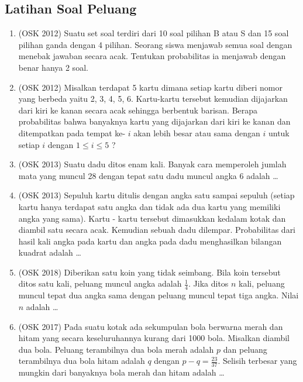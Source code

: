 \subsection{Latihan Soal Peluang}
\begin{enumerate}
            \item (OSK 2012) Suatu set soal terdiri dari 10 soal pilihan B atau S dan 15 soal pilihan ganda dengan 4 pilihan. Seorang siswa menjawab semua soal dengan menebak jawaban secara acak. Tentukan probabilitas ia menjawab dengan benar hanya 2 soal.
        
        \item (OSK 2012) Misalkan terdapat 5 kartu dimana setiap kartu diberi nomor yang berbeda yaitu 2, 3, 4, 5, 6. Kartu-kartu tersebut kemudian dijajarkan dari kiri ke kanan secara acak sehingga berbentuk barisan. Berapa probabilitas bahwa banyaknya kartu yang dijajarkan dari kiri ke kanan dan ditempatkan pada tempat ke- $i$ akan lebih besar atau sama dengan $i$ untuk setiap $i$ dengan $1 \le i \le 5$ ?
        
        \item (OSK 2013) Suatu dadu ditos enam kali. Banyak cara memperoleh jumlah mata yang muncul 28 dengan tepat satu dadu muncul angka 6 adalah \dots
        
        \item (OSK 2013) Sepuluh kartu ditulis dengan angka satu sampai sepuluh (setiap kartu hanya terdapat satu angka dan tidak ada dua kartu yang memiliki angka yang sama). Kartu - kartu tersebut dimasukkan kedalam kotak dan diambil satu secara acak. Kemudian sebuah dadu dilempar. Probabilitas dari hasil kali angka pada kartu dan angka pada dadu menghasilkan bilangan kuadrat adalah \dots
        
        \item (OSK 2018) Diberikan satu koin yang tidak seimbang. Bila koin tersebut ditos satu kali, peluang muncul angka adalah $\frac{1}{4}$. Jika ditos $n$ kali, peluang muncul tepat dua angka sama dengan peluang muncul tepat tiga angka. Nilai $n$ adalah \dots
        
        \item (OSK 2017) Pada suatu kotak ada sekumpulan bola berwarna merah dan hitam yang secara keseluruhannya kurang dari 1000 bola. Misalkan diambil dua bola. Peluang terambilnya dua bola merah adalah $p$ dan peluang terambilnya dua bola hitam adalah $q$ dengan $p-q =\frac{23}{37}$. Selisih terbesar yang mungkin dari banyaknya bola merah dan hitam adalah \dots
\end{enumerate}
